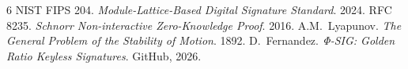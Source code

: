 \documentclass[11pt,a4paper]{article}
\begin{document}
\begin{thebibliography}{6}
 NIST FIPS 204. \textit{Module-Lattice-Based Digital Signature Standard}. 2024.
 RFC 8235. \textit{Schnorr Non-interactive Zero-Knowledge Proof}. 2016.
 A.M.~Lyapunov. \textit{The General Problem of the Stability of Motion}. 1892.
 D.~Fernandez. \textit{Φ-SIG: Golden Ratio Keyless Signatures}. GitHub, 2026.
\end{thebibliography}
\end{document}
